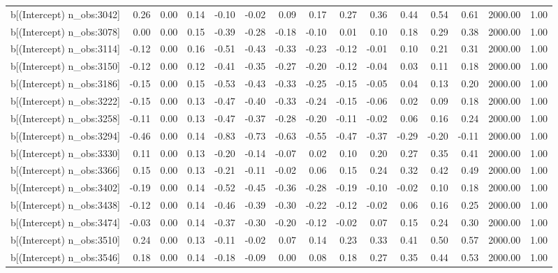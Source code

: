 \begin{table}[ht]
\begin{tabular}{rrrrrrrrrrrrrrr}
  b[(Intercept) n\_obs:3042] & 0.26 & 0.00 & 0.14 & -0.10 & -0.02 & 0.09 & 0.17 & 0.27 & 0.36 & 0.44 & 0.54 & 0.61 & 2000.00 & 1.00 \\ 
  b[(Intercept) n\_obs:3078] & 0.00 & 0.00 & 0.15 & -0.39 & -0.28 & -0.18 & -0.10 & 0.01 & 0.10 & 0.18 & 0.29 & 0.38 & 2000.00 & 1.00 \\ 
  b[(Intercept) n\_obs:3114] & -0.12 & 0.00 & 0.16 & -0.51 & -0.43 & -0.33 & -0.23 & -0.12 & -0.01 & 0.10 & 0.21 & 0.31 & 2000.00 & 1.00 \\ 
  b[(Intercept) n\_obs:3150] & -0.12 & 0.00 & 0.12 & -0.41 & -0.35 & -0.27 & -0.20 & -0.12 & -0.04 & 0.03 & 0.11 & 0.18 & 2000.00 & 1.00 \\ 
  b[(Intercept) n\_obs:3186] & -0.15 & 0.00 & 0.15 & -0.53 & -0.43 & -0.33 & -0.25 & -0.15 & -0.05 & 0.04 & 0.13 & 0.20 & 2000.00 & 1.00 \\ 
  b[(Intercept) n\_obs:3222] & -0.15 & 0.00 & 0.13 & -0.47 & -0.40 & -0.33 & -0.24 & -0.15 & -0.06 & 0.02 & 0.09 & 0.18 & 2000.00 & 1.00 \\ 
  b[(Intercept) n\_obs:3258] & -0.11 & 0.00 & 0.13 & -0.47 & -0.37 & -0.28 & -0.20 & -0.11 & -0.02 & 0.06 & 0.16 & 0.24 & 2000.00 & 1.00 \\ 
  b[(Intercept) n\_obs:3294] & -0.46 & 0.00 & 0.14 & -0.83 & -0.73 & -0.63 & -0.55 & -0.47 & -0.37 & -0.29 & -0.20 & -0.11 & 2000.00 & 1.00 \\ 
  b[(Intercept) n\_obs:3330] & 0.11 & 0.00 & 0.13 & -0.20 & -0.14 & -0.07 & 0.02 & 0.10 & 0.20 & 0.27 & 0.35 & 0.41 & 2000.00 & 1.00 \\ 
  b[(Intercept) n\_obs:3366] & 0.15 & 0.00 & 0.13 & -0.21 & -0.11 & -0.02 & 0.06 & 0.15 & 0.24 & 0.32 & 0.42 & 0.49 & 2000.00 & 1.00 \\ 
  b[(Intercept) n\_obs:3402] & -0.19 & 0.00 & 0.14 & -0.52 & -0.45 & -0.36 & -0.28 & -0.19 & -0.10 & -0.02 & 0.10 & 0.18 & 2000.00 & 1.00 \\ 
  b[(Intercept) n\_obs:3438] & -0.12 & 0.00 & 0.14 & -0.46 & -0.39 & -0.30 & -0.22 & -0.12 & -0.02 & 0.06 & 0.16 & 0.25 & 2000.00 & 1.00 \\ 
  b[(Intercept) n\_obs:3474] & -0.03 & 0.00 & 0.14 & -0.37 & -0.30 & -0.20 & -0.12 & -0.02 & 0.07 & 0.15 & 0.24 & 0.30 & 2000.00 & 1.00 \\ 
  b[(Intercept) n\_obs:3510] & 0.24 & 0.00 & 0.13 & -0.11 & -0.02 & 0.07 & 0.14 & 0.23 & 0.33 & 0.41 & 0.50 & 0.57 & 2000.00 & 1.00 \\ 
  b[(Intercept) n\_obs:3546] & 0.18 & 0.00 & 0.14 & -0.18 & -0.09 & 0.00 & 0.08 & 0.18 & 0.27 & 0.35 & 0.44 & 0.53 & 2000.00 & 1.00 \\ 

\end{tabular}
\end{table}
